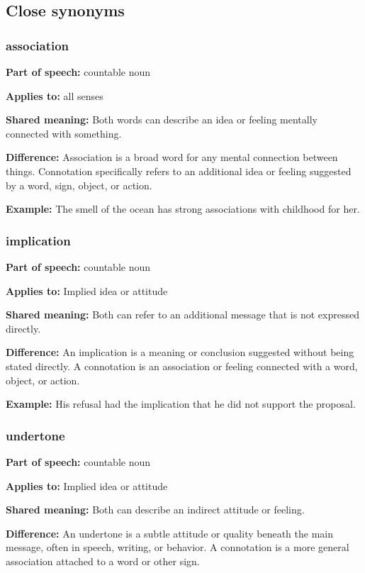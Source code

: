 \documentclass[11pt]{article}
\begin{document}
\subsection{Close synonyms}
\subsubsection{association}
\textbf{Part of speech:} countable noun

\textbf{Applies to:} all senses

\textbf{Shared meaning:} Both words can describe an idea or feeling mentally connected with something.

\textbf{Difference:} Association is a broad word for any mental connection between things. Connotation specifically refers to an additional idea or feeling suggested by a word, sign, object, or action.

\textbf{Example:} The smell of the ocean has strong associations with childhood for her.

\subsubsection{implication}
\textbf{Part of speech:} countable noun

\textbf{Applies to:} Implied idea or attitude

\textbf{Shared meaning:} Both can refer to an additional message that is not expressed directly.

\textbf{Difference:} An implication is a meaning or conclusion suggested without being stated directly. A connotation is an association or feeling connected with a word, object, or action.

\textbf{Example:} His refusal had the implication that he did not support the proposal.

\subsubsection{undertone}
\textbf{Part of speech:} countable noun

\textbf{Applies to:} Implied idea or attitude

\textbf{Shared meaning:} Both can describe an indirect attitude or feeling.

\textbf{Difference:} An undertone is a subtle attitude or quality beneath the main message, often in speech, writing, or behavior. A connotation is a more general association attached to a word or other sign.
\end{document}

